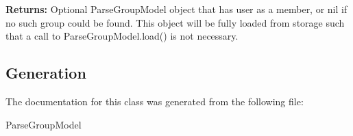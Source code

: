 \textbf{Returns:}
Optional ParseGroupModel object that has user as a member, or nil if no such group could be found. This object will be fully loaded from storage such that a call to ParseGroupModel.load() is not necessary.\\






\subsection{Generation}
The documentation for this class was generated from the following file\-:
\begin{DoxyCompactItemize}
\item ParseGroupModel
\end{DoxyCompactItemize} 









